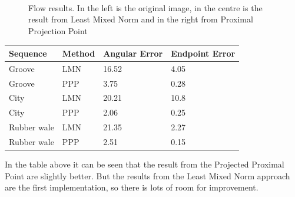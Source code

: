 \documentclass[12pt,a4paper,twoside]{report}
\begin{document}
{\begin{figure}
	 \\
	\caption{Flow results. In the left is the original image, in the centre is the result from Least Mixed Norm and in the right from Proximal Projection Point}
\end{figure}

\begin{center}
	\begin{tabular}{  l  l  l  l }
		\hline
		Sequence & Method & Angular Error & Endpoint Error \\ \hline
		\hline
		Groove & LMN & 16.52 & 4.05 \\
		Groove & PPP & 3.75 & 0.28 \\
		City & LMN & 20.21 & 10.8 \\
		City & PPP & 2.06 & 0.25 \\
		Rubber wale & LMN & 21.35 & 2.27 \\
		Rubber wale & PPP & 2.51& 0.15 \\
	\end{tabular}
\end{center} 

In the table above it can be seen that the result from the Projected Proximal Point are slightly better. But the results from the Least Mixed Norm approach are the first implementation, so there is lots of room for improvement.

}
\end{document}
